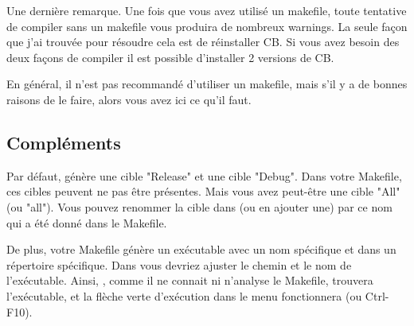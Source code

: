 Une dernière remarque. Une fois que vous avez utilisé un makefile, toute tentative de compiler sans un makefile vous produira de nombreux warnings. La seule façon que j'ai trouvée pour résoudre cela est de réinstaller CB. Si vous avez besoin des deux façons de compiler il est possible d'installer 2 versions de CB.


En général, il n'est pas recommandé d'utiliser un makefile, mais s'il y a de bonnes raisons de le faire, alors vous avez ici ce qu'il faut. 

\subsection{Compléments}

Par défaut, \codeblocks génère une cible "Release" et une cible "Debug". Dans votre Makefile, ces cibles peuvent ne pas être présentes. Mais vous avez peut-être une cible "All" (ou "all"). Vous pouvez renommer la cible dans \codeblocks (ou en ajouter une) par ce nom qui a été donné dans le Makefile. 

De plus, votre Makefile génère un exécutable avec un nom spécifique et dans un répertoire spécifique. Dans \codeblocks vous devriez ajuster le chemin et le nom de l'exécutable. Ainsi, \codeblocks, comme il ne connait ni n'analyse le Makefile, trouvera l'exécutable, et la flèche verte d'exécution dans le menu fonctionnera (ou Ctrl-F10).

